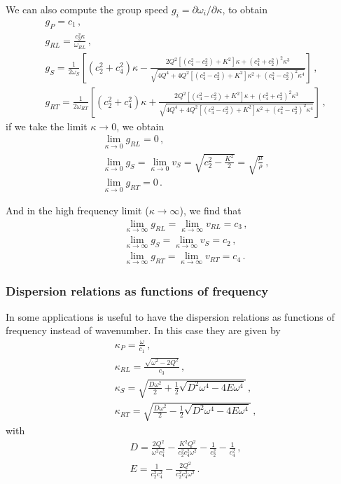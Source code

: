 \documentclass[12pt]{article}
\begin{document}
We can also compute the group speed \(g_i = \partial \omega_i/\partial \kappa\), to obtain
\begin{align}
&g_P = c_1 \, ,\\
&g_{RL} = \frac{c_3^2 \kappa}{\omega_{RL}}\, ,\\
&g_S = \frac{1}{2\omega_S}\left[(c_2^2 + c_4^2)\kappa - \frac{2Q^2[(c_4^2 - c_2^2) + K^2]\kappa + (c_4^2 + c_2^2)^2\kappa^3}{\sqrt{4Q^4 + 4Q^2[(c_4^2 - c_2^2) + K^2]\kappa^2 + (c_4^2 - c_2^2)^2 \kappa^4}}\right] \, ,\\
&g_{RT} = \frac{1}{2\omega_{RT}}\left[(c_2^2 + c_4^2)\kappa + \frac{2Q^2[(c_4^2 - c_2^2) + K^2]\kappa + (c_4^2 + c_2^2)^2\kappa^3}{\sqrt{4Q^4 +  4Q^2[(c_4^2 - c_2^2) + K^2]\kappa^2 + (c_4^2 - c_2^2)^2 \kappa^4}}\right]\, ,
\end{align}
if we take the limit \(\kappa \rightarrow 0\), we obtain
\begin{align*}
&\lim_{\kappa \rightarrow 0}g_{RL} = 0\, ,\\
&\lim_{\kappa \rightarrow 0}g_S = \lim_{\kappa \rightarrow 0} v_S = \sqrt{c_2^2 - \frac{K^2}{2}}=\sqrt{\frac{\mu}{\rho}}\, ,\\
&\lim_{\kappa \rightarrow 0}g_{RT} = 0\, .
\end{align*}

And in the high frequency limit (\(\kappa \rightarrow \infty\)), we find that
\begin{align*}
&\lim_{\kappa \rightarrow \infty}g_{RL} = \lim_{\kappa \rightarrow \infty}v_{RL} = c_3\, ,\\
&\lim_{\kappa \rightarrow \infty}g_S = \lim_{\kappa \rightarrow \infty}v_S = c_2\, ,\\
&\lim_{\kappa \rightarrow \infty}g_{RT} = \lim_{\kappa \rightarrow \infty}v_{RT} = c_4\, .
\end{align*}

\subsubsection{Dispersion relations as functions of frequency}
In some applications is useful to have the dispersion relations as functions of frequency instead of wavenumber. In this case they are given by
\begin{align}
&\kappa_P = \frac{\omega}{c_1}\, ,\\
&\kappa_{RL} = \frac{\sqrt{\omega^2 - 2Q^2}}{c_3}\, ,\\
&\kappa_S = \sqrt{\frac{D\omega^2}{2} + \frac{1}{2} \sqrt{D^2 \omega^4 - 4E\omega^4}}\, ,\\
&\kappa_{RT} = \sqrt{\frac{D\omega^2}{2} - \frac{1}{2} \sqrt{D^2 \omega^4 - 4E\omega^4}}\, ,
\end{align}
with
\begin{align*}
&D = \frac{2Q^2}{\omega^2 c_4^2} - \frac{K^2 Q^2}{c_2^2 c_4^2 \omega^2} - \frac{1}{c_2^2} - \frac{1}{c_4^2}\, ,\\
&E = \frac{1}{c_2^2 c_4^2} - \frac{2Q^2}{c_2^2 c_4^2 \omega^2}\, .
\end{align*}
\end{document}
